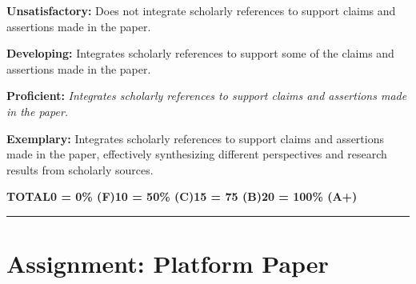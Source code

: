 \documentclass[
]{book}
\begin{document}
\textbf{Unsatisfactory:} Does not integrate scholarly references to support claims and assertions made in
the paper.

\textbf{Developing:} Integrates scholarly references to support some of the claims and assertions
made in the paper.

\textbf{Proficient:} \emph{Integrates scholarly references to support claims and assertions made in the
paper.}

\textbf{Exemplary:} Integrates scholarly references to support claims and assertions made in the
paper, effectively synthesizing different perspectives and research results from
scholarly sources.

\textbar{}\textbf{TOTAL}\textbar{}\textbf{0 = 0\% (F)}\textbar{}\textbf{10 = 50\% (C)}\textbar{}\textbf{15 = 75 (B)}\textbar{}\textbf{20 = 100\% (A+)}\textbar{}

\begin{center}\rule{0.5\linewidth}{0.5pt}\end{center}

\hypertarget{assignment-platform-paper}{%
\section*{Assignment: Platform Paper}\label{assignment-platform-paper}}
\end{document}
